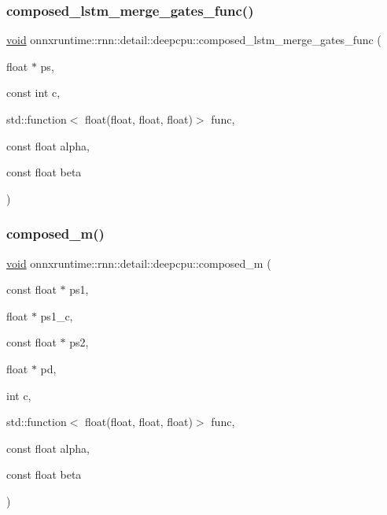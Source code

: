 \subsubsection{\texorpdfstring{composed\+\_\+lstm\+\_\+merge\+\_\+gates\+\_\+func()}{composed\_lstm\_merge\_gates\_func()}}
{\footnotesize\ttfamily \mbox{\hyperlink{mlasi_8h_a88f941d423cb2a819b70a1358982b1a6}{void}} onnxruntime\+::rnn\+::detail\+::deepcpu\+::composed\+\_\+lstm\+\_\+merge\+\_\+gates\+\_\+func (\begin{DoxyParamCaption}\item[{float $\ast$}]{ps,  }\item[{const int}]{c,  }\item[{std\+::function$<$ float(float, float, float)$>$}]{func,  }\item[{const float}]{alpha,  }\item[{const float}]{beta }\end{DoxyParamCaption})}

\mbox{\label{namespaceonnxruntime_1_1rnn_1_1detail_1_1deepcpu_a78584ae89a0559ff0001b4ffc3d0dcb7}} 
\subsubsection{\texorpdfstring{composed\+\_\+m()}{composed\_m()}}
{\footnotesize\ttfamily \mbox{\hyperlink{mlasi_8h_a88f941d423cb2a819b70a1358982b1a6}{void}} onnxruntime\+::rnn\+::detail\+::deepcpu\+::composed\+\_\+m (\begin{DoxyParamCaption}\item[{const float $\ast$}]{ps1,  }\item[{float $\ast$}]{ps1\+\_\+c,  }\item[{const float $\ast$}]{ps2,  }\item[{float $\ast$}]{pd,  }\item[{int}]{c,  }\item[{std\+::function$<$ float(float, float, float)$>$}]{func,  }\item[{const float}]{alpha,  }\item[{const float}]{beta }\end{DoxyParamCaption})}

